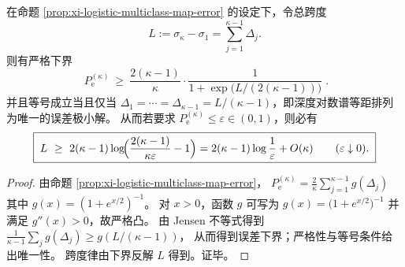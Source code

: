 \begin{corollary}\label{cor:xi-logistic-optimal-spacing-span-law}
在命题 \ref{prop:xi-logistic-multiclass-map-error} 的设定下，令总跨度
\[
L:=\sigma_\kappa-\sigma_1=\sum_{j=1}^{\kappa-1}\Delta_j.
\]
则有严格下界
\[
\boxed{\;
P_{\mathrm e}^{(\kappa)}
\ \ge\
\frac{2(\kappa-1)}{\kappa}\cdot\frac{1}{1+\exp\!\bigl(L/(2(\kappa-1))\bigr)}\; }.
\]
并且等号成立当且仅当
\(
\Delta_1=\cdots=\Delta_{\kappa-1}=L/(\kappa-1)
\)，即深度对数谱等距排列为唯一的误差极小解。
从而若要求 \(P_{\mathrm e}^{(\kappa)}\le \varepsilon\in(0,1)\)，则必有
\[
\boxed{\;
L\ \ge\ 2(\kappa-1)\log\!\Bigl(\frac{2(\kappa-1)}{\kappa\varepsilon}-1\Bigr)
=2(\kappa-1)\log\frac{1}{\varepsilon}+O(\kappa)\qquad(\varepsilon\downarrow0).\;}
\]
\end{corollary}
\begin{proof}
由命题 \ref{prop:xi-logistic-multiclass-map-error}，
\(
P_{\mathrm e}^{(\kappa)}=\frac{2}{\kappa}\sum_{j=1}^{\kappa-1}g(\Delta_j)
\)
其中 \(g(x)=(1+e^{x/2})^{-1}\)。
对 \(x>0\)，函数 \(g\) 可写为 \(g(x)=\bigl(1+e^{x/2}\bigr)^{-1}\) 并满足 \(g''(x)>0\)，故严格凸。
由 Jensen 不等式得到
\(
\frac{1}{\kappa-1}\sum_{j}g(\Delta_j)\ge g(L/(\kappa-1))
\)，
从而得到误差下界；严格性与等号条件给出唯一性。
跨度律由下界反解 \(L\) 得到。证毕。
\end{proof}

